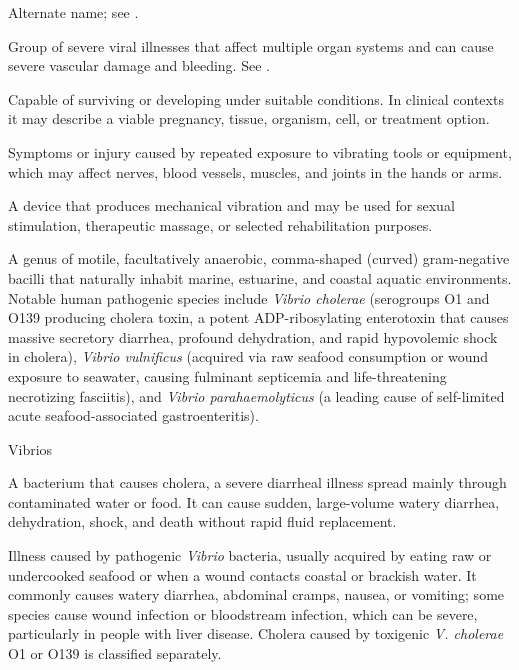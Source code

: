  Alternate name; see .

 Group of severe viral illnesses that affect multiple organ systems and can cause severe vascular damage and bleeding. See .

 Capable of surviving or developing under suitable conditions. In clinical contexts it may describe a viable pregnancy, tissue, organism, cell, or treatment option.

 Symptoms or injury caused by repeated exposure to vibrating tools or equipment, which may affect nerves, blood vessels, muscles, and joints in the hands or arms.

 A device that produces mechanical vibration and may be used for sexual stimulation, therapeutic massage, or selected rehabilitation purposes.

 A genus of motile, facultatively anaerobic, comma-shaped (curved) gram-negative bacilli that naturally inhabit marine, estuarine, and coastal aquatic environments. Notable human pathogenic species include \textit{Vibrio cholerae} (serogroups O1 and O139 producing cholera toxin, a potent ADP-ribosylating enterotoxin that causes massive secretory diarrhea, profound dehydration, and rapid hypovolemic shock in cholera), \textit{Vibrio vulnificus} (acquired via raw seafood consumption or wound exposure to seawater, causing fulminant septicemia and life-threatening necrotizing fasciitis), and \textit{Vibrio parahaemolyticus} (a leading cause of self-limited acute seafood-associated gastroenteritis).

\synonyms
Vibrios

 A bacterium that causes cholera, a severe diarrheal illness spread mainly through contaminated water or food. It can cause sudden, large-volume watery diarrhea, dehydration, shock, and death without rapid fluid replacement.

 Illness caused by pathogenic \textit{Vibrio} bacteria, usually acquired by eating raw or undercooked seafood or when a wound contacts coastal or brackish water. It commonly causes watery diarrhea, abdominal cramps, nausea, or vomiting; some species cause wound infection or bloodstream infection, which can be severe, particularly in people with liver disease. Cholera caused by toxigenic \textit{V. cholerae} O1 or O139 is classified separately.

